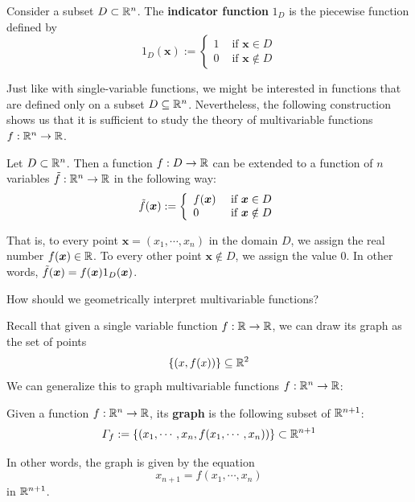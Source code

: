\begin{definition}
    Consider a subset $D \subset \mathbb{R}^n$.  The \textbf{indicator function} $1_D$ is the piecewise function defined by
    $$1_D(\bm{x}) := \left\{
		\begin{array}{ll}
			1 & \text{ if } \bm{x} \in D \\
			0 & \text{ if } \bm{x} \notin D
		\end{array}
		\right.$$
    
    \end{definition}



Just like with single-variable functions, we might be interested in functions that are defined only on a subset $D \subseteq \mathbb{R}^n$.  Nevertheless, the following construction shows us that it is sufficient to study the theory of multivariable functions $f : \mathbb{R}^n \to \mathbb{R}$.

\begin{example}
Let $D \subset \mathbb{R}^n$.  Then a function $f : D \to \mathbb{R}$ can be extended to a function of $n$ variables $\Tilde{f} : \mathbb{R}^n \to \mathbb{R}$ in the following way:
$$\Tilde{f}(\bm{x}) := \left\{
		\begin{array}{ll}
			f(\bm{x}) & \text{ if } \bm{x} \in D \\
			0 & \text{ if } \bm{x} \notin D
		\end{array}
		\right.$$

That is, to every point $\bm{x}=(x_1,\cdots,x_n)$ in the domain $D$, we assign the real number $f(\bm{x}) \in \mathbb{R}$.  To every other point $\bm{x} \notin D$, we assign the value $0$.  In other words,  $\Tilde{f}(\bm{x}) = f(\bm{x})1_D(\bm{x})$.  

\end{example}

\begin{motivating}
How should we geometrically interpret multivariable functions?
\end{motivating}

Recall that given a single variable function $f: \mathbb{R} \to \mathbb{R}$, we can draw its graph as the set of points $$\{(x, f(x)) \} \subseteq \mathbb{R}^2$$  We can generalize this to graph multivariable functions $f : \mathbb{R}^n \to \mathbb{R}$:

\begin{definition}
Given a function $f: \mathbb{R}^n \to \mathbb{R}$, its \textbf{graph} is the following subset of $\mathbb{R}^{n+1}$:
$$\Gamma_f := \{(x_1,\cdots, x_n,f(x_1, \cdots, x_n)) \} \subset \mathbb{R}^{n+1}$$ 

In other words, the graph is given by the equation $$x_{n+1} = f(x_1, \cdots, x_n)$$ in $\mathbb{R}^{n+1}$.
\end{definition}

